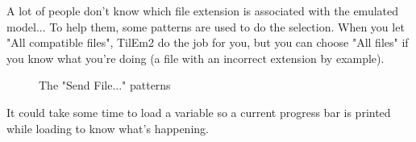 \documentclass[10pt]{report}
\begin{document}
A lot of people don't know which file extension is associated with the emulated model...\newline
To help them, some patterns are used to do the selection.\newline
When you let "All compatible files", TilEm2 do the job for you, but you can choose "All files" if you know what you're doing (a file with an incorrect extension by example).\newline
\begin{figure}[H]
\centering
{}
\caption{The "Send File..." patterns}
\end{figure}

It could take some time to load a variable so a current progress bar is printed while loading to know what's happening.\newline
\end{document}
